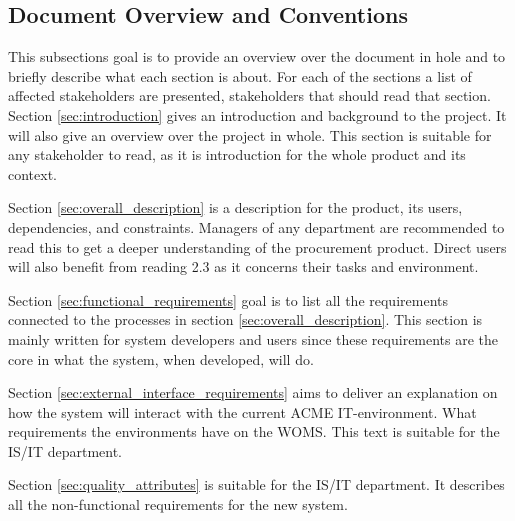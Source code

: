 \subsection{Document Overview and Conventions}
This subsections goal is to provide an overview over the document in hole and to briefly describe what each section is about. For each of the sections a list of affected stakeholders are presented, stakeholders that should read that section. 
Section \ref{sec:introduction} gives an introduction and background to the project. It will also give an overview over the project in whole. This section is suitable for any stakeholder to read, as it is introduction for the whole product and its context.	

Section \ref{sec:overall_description} is a description for the product, its users, dependencies, and constraints. Managers of any department are recommended to read this to get a deeper understanding of the procurement product. Direct users will also benefit from reading 2.3 as it concerns their tasks and environment.

Section \ref{sec:functional_requirements} goal is to list all the requirements connected to the processes in section \ref{sec:overall_description}. This section is mainly written for system developers and users since these requirements are the core in what the system, when developed, will do. 

Section \ref{sec:external_interface_requirements} aims to deliver an explanation on how the system will interact with the current ACME IT-environment. What requirements the environments have on the WOMS. This text is suitable for the IS/IT department.

Section \ref{sec:quality_attributes} is suitable for the IS/IT department. It describes all the non-functional requirements for the new system. 

